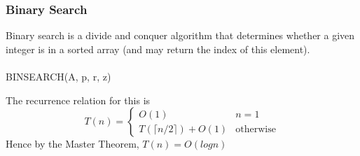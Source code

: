 \documentclass{article}
\begin{document}
        \subsubsection{Binary Search}
            Binary search is a divide and conquer algorithm that determines whether a given integer is in a sorted array (and may return the index of this element). \\ \\
            BINSEARCH(A, p, r, z)
            \begin{algorithmic}
                \Else
                    \Else
                    \EndIf
                \EndIf
            \end{algorithmic}
            The recurrence relation for this is 
            \[ 
                T(n) = 
                \begin{cases} 
                    O(1) & n = 1\\
                    T(\lceil n / 2 \rceil) + O(1) & \text{otherwise}
                \end{cases}
            \]
            Hence by the Master Theorem, $T(n) = O(log n)$
\end{document}
